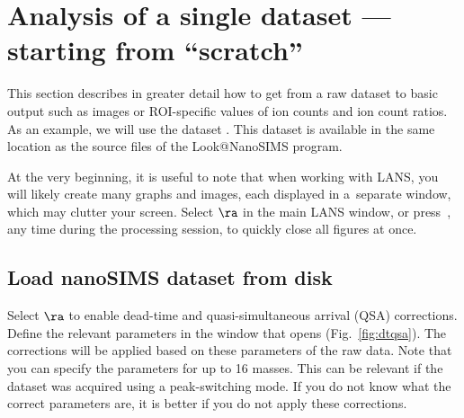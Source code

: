 \section{Analysis of a single dataset --- starting from ``scratch''}
\label{sec:level1}

This section describes in greater detail how to get from a raw dataset to basic output such as images or ROI-specific values of ion counts and ion count ratios. As an example, we will use the dataset . This dataset is available in the same location as the source files of the Look@NanoSIMS program.

At the very beginning, it is useful to note that when working with LANS, you will likely create many graphs and images, each displayed in a~separate window, which may clutter your screen. Select  $\ra$  in the main LANS window, or press~, any time during the processing session, to quickly close all figures at once.


\subsection{Load nanoSIMS dataset from disk}
\setcounter{step}{0}

\s Select  $\ra$  to enable dead-time and quasi-simul\-ta\-neous arrival (QSA) corrections. Define the relevant parameters in the window that opens (Fig.~\ref{fig:dtqsa}). The corrections will be applied based on these parameters  of the raw data. Note that you can specify the parameters for up to 16 masses. This can be relevant if the dataset was acquired using a peak-switching mode. If you do not know what the correct parameters are, it is better if you do not apply these corrections.

